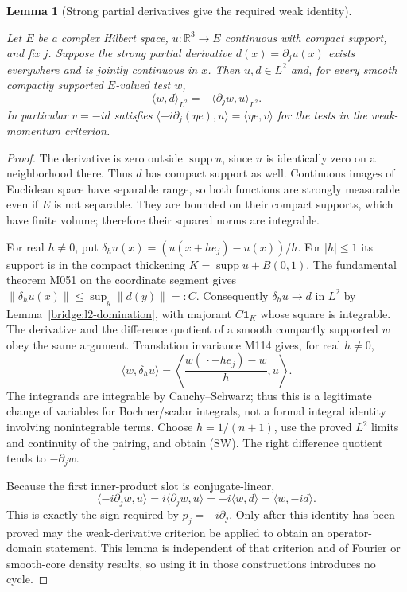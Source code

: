\documentclass[11pt,a4paper]{article}
\newtheorem{lemma}[theorem]{Lemma}
\theoremstyle{definition}
\theoremstyle{remark}
\newcommand{\proofid}[1]{\par\smallskip{\normalfont\scriptsize\color{inkblue}Stable ID: \nolinkurl{#1}}\par\smallskip}
\begin{document}
\begin{lemma}[Strong partial derivatives give the required weak identity]
\label{bridge:strong-weak}
\proofid{bridge:strong-weak}
\par{}\par\smallskip
Let $E$ be a complex Hilbert space, $u:\mathbb R^3\to E$ continuous
with compact support, and fix $j$. Suppose the strong partial derivative
$d(x)=\partial_j u(x)$ exists everywhere and is jointly continuous in
$x$. Then $u,d\in L^2$ and, for every smooth compactly supported
$E$-valued test $w$,
\[
 \langle w,d\rangle_{L^2}=-\langle\partial_j w,u\rangle_{L^2}.
                                                               \tag{SW}
\]
In particular $v=-id$ satisfies
$\langle -i\partial_j(\eta e),u\rangle=
  \langle\eta e,v\rangle$ for the tests in the weak-momentum criterion.
\end{lemma}
\begin{proof}
The derivative is zero outside $\operatorname{supp}u$, since $u$ is
identically zero on a neighborhood there. Thus $d$ has compact support
as well. Continuous images of Euclidean space have separable range,
so both functions are strongly measurable even if $E$ is not separable.
They are bounded on their compact supports, which have finite volume;
therefore their squared norms are integrable.

For real $h\ne0$, put
$\delta_hu(x)=(u(x+he_j)-u(x))/h$.
For $|h|\leq1$ its support is in the compact thickening
$K=\operatorname{supp}u+\overline B(0,1)$. The fundamental theorem M051
on the coordinate segment gives
$\|\delta_hu(x)\|\leq\sup_y\|d(y)\|=:C$.
Consequently $\delta_hu\to d$ in $L^2$ by
Lemma~\ref{bridge:l2-domination}, with majorant $C\mathbf1_K$ whose
square is integrable. The derivative and the difference quotient of a
smooth compactly supported $w$ obey the same argument. Translation
invariance M114 gives, for real $h\ne0$,
\[
 \langle w,\delta_hu\rangle
 =\left\langle\frac{w(\,\cdot-he_j)-w}{h},u\right\rangle.
\]
The integrands are integrable by Cauchy--Schwarz; thus this is a legitimate
change of variables for Bochner/scalar integrals, not a formal integral
identity involving nonintegrable terms. Choose $h=1/(n+1)$, use the
proved $L^2$ limits and continuity of the pairing, and obtain (SW).
The right difference quotient tends to $-\partial_jw$.

Because the first inner-product slot is conjugate-linear,
\[
 \langle -i\partial_jw,u\rangle
 =i\langle\partial_jw,u\rangle
 =-i\langle w,d\rangle=\langle w,-id\rangle.
\]
This is exactly the sign required by $p_j=-i\partial_j$. Only after this
identity has been proved may the weak-derivative criterion be applied
to obtain an operator-domain statement. This lemma is independent of
that criterion and of Fourier or smooth-core density results, so using
it in those constructions introduces no cycle.
\end{proof}
\end{document}
